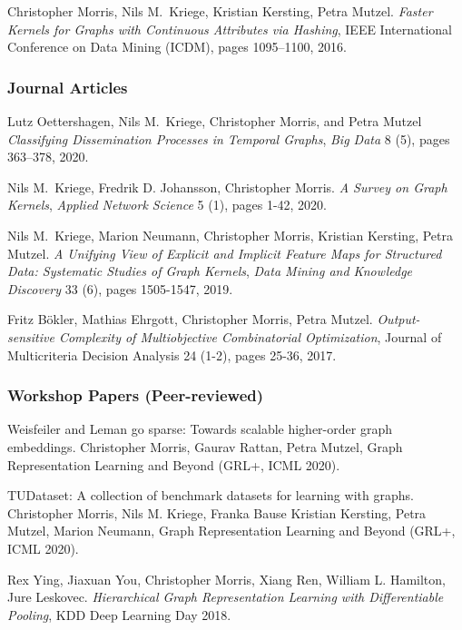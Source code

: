 \documentclass[11pt, a4paper]{scrartcl}
\begin{document}
\begin{thebibliography}{5}
    Christopher Morris, Nils M.~Kriege, Kristian Kersting, Petra Mutzel.
	\emph{Faster Kernels for Graphs with Continuous Attributes via Hashing},
	IEEE International Conference on Data Mining (ICDM), pages 1095--1100, 2016.
	
\subsubsection*{Journal Articles}

Lutz Oettershagen, Nils M.~Kriege, Christopher Morris, and Petra Mutzel
\emph{Classifying Dissemination Processes in Temporal Graphs},
\emph{Big Data} 8 (5), pages 363--378, 2020.

Nils M.~Kriege,  Fredrik D. Johansson, Christopher Morris.
\emph{A Survey on Graph Kernels},
\emph{Applied Network Science} 5 (1), pages 1-42, 2020.

Nils M.~Kriege,  Marion Neumann, Christopher Morris, Kristian Kersting, Petra Mutzel.
\emph{A Unifying View of Explicit and Implicit Feature Maps for Structured Data: Systematic Studies of Graph Kernels},
\emph{Data Mining and Knowledge Discovery} 33 (6), pages 1505-1547, 2019.

Fritz B\"okler, Mathias Ehrgott, Christopher Morris, Petra Mutzel.
\emph{Output-sensitive Complexity of Multiobjective Combinatorial Optimization},
Journal of Multicriteria Decision Analysis 24 (1-2), pages 25-36, 2017.

\subsubsection*{Workshop Papers (Peer-reviewed)}

Weisfeiler and Leman go sparse: Towards scalable higher-order graph embeddings.
Christopher Morris, Gaurav Rattan, Petra Mutzel,
Graph Representation Learning and Beyond (GRL+, ICML 2020).

TUDataset: A collection of benchmark datasets for learning with graphs.
Christopher Morris, Nils M. Kriege, Franka Bause Kristian Kersting, Petra Mutzel, Marion Neumann,
Graph Representation Learning and Beyond (GRL+, ICML 2020).

Rex Ying, Jiaxuan You, Christopher Morris, Xiang Ren, William L. Hamilton, Jure Leskovec.
\emph{Hierarchical Graph Representation Learning with Differentiable Pooling},
KDD Deep Learning Day 2018.


\end{thebibliography}
\end{document}
